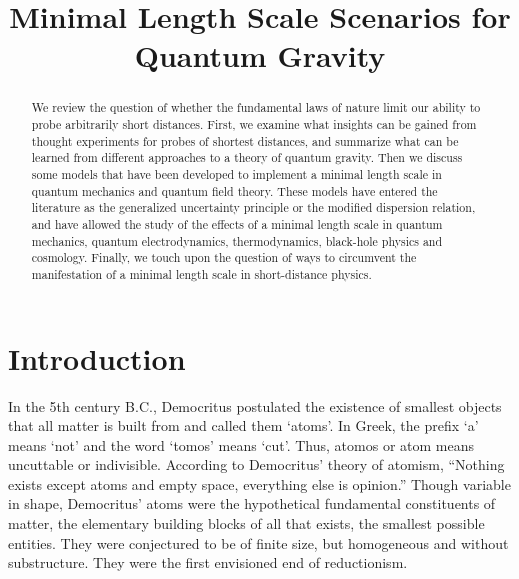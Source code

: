 \documentclass{article}
\begin{document}
\title{Minimal Length Scale Scenarios for Quantum Gravity}

\author{%
}

\date{}
\maketitle


\begin{abstract}
We review the question of whether the fundamental laws of nature limit 
our ability to probe arbitrarily short distances. First, we examine what insights
can be gained from thought experiments for probes of shortest distances, and
summarize what can be
learned from different approaches to a theory of quantum gravity. Then we discuss 
some models that have been developed to implement a minimal length scale in quantum mechanics
and quantum field theory. These models have entered the literature as the generalized uncertainty principle or the modified dispersion relation, and have allowed 
the study of the effects of a minimal length scale in quantum mechanics, quantum electrodynamics, 
thermodynamics,
black-hole physics and cosmology. Finally, we touch upon the question of ways to circumvent
the manifestation of a minimal length scale in short-distance physics.
\end{abstract}





\newpage
\tableofcontents

\newpage

\section{Introduction}


In the 5th century B.C., Democritus postulated the existence of
smallest objects that all matter is built from and called them
`atoms'. In Greek, the prefix `a' means `not' and the word `tomos'
means `cut'. Thus, atomos or atom means uncuttable or
indivisible. According to Democritus' theory of atomism, ``Nothing
exists except atoms and empty space, everything else is opinion.''
Though variable in shape, Democritus' atoms were the hypothetical
fundamental constituents of matter, the elementary building blocks of
all that exists, the smallest possible entities. They were conjectured
to be of finite size, but homogeneous and without substructure. They
were the first envisioned end of reductionism.
 
\end{document}
